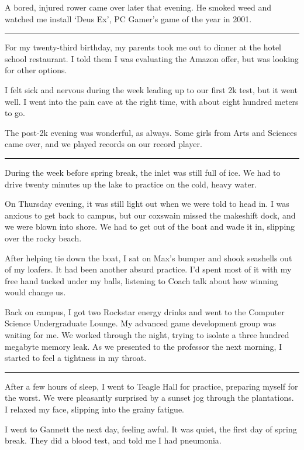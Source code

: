 A bored, injured rower came over later that evening.  He smoked weed and watched
me install `Deus Ex', PC Gamer's game of the year in 2001.

\plainfancybreak{12pt}{2}{}

For my twenty-third birthday, my parents took me out to dinner at the hotel
school restaurant.  I told them I was evaluating the Amazon offer, but was
looking for other options.

I felt sick and nervous during the week leading up to our first 2k test, but it
went well.  I went into the pain cave at the right time, with about eight
hundred meters to go.

The post-2k evening was wonderful, as always.  Some girls from Arts and Sciences
came over, and we played records on our record player.

\plainfancybreak{12pt}{2}{}

During the week before spring break, the inlet was still full of ice.  We had to
drive twenty minutes up the lake to practice on the cold, heavy water.

On Thursday evening, it was still light out when we were told to head in.  I was
anxious to get back to campus, but our coxswain missed the makeshift dock, and
we were blown into shore.  We had to get out of the boat and wade it in,
slipping over the rocky beach.

After helping tie down the boat, I sat on Max's bumper and shook seashells out
of my loafers.  It had been another absurd practice.  I'd spent most of it with
my free hand tucked under my balls, listening to Coach talk about how winning
would change us.

Back on campus, I got two Rockstar energy drinks and went to the Computer
Science Undergraduate Lounge.  My advanced game development group was waiting
for me.  We worked through the night, trying to isolate a three hundred megabyte
memory leak.  As we presented to the professor the next morning, I started to
feel a tightness in my throat.

\plainfancybreak{12pt}{2}{}

After a few hours of sleep, I went to Teagle Hall for practice, preparing myself
for the worst.  We were pleasantly surprised by a sunset jog through the
plantations.  I relaxed my face, slipping into the grainy fatigue.

I went to Gannett the next day, feeling awful.  It was quiet, the first day of
spring break.  They did a blood test, and told me I had pneumonia.

